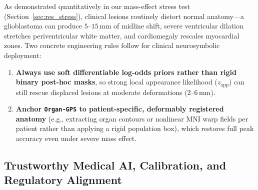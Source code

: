 \documentclass[10pt,a4paper]{article}
\renewcommand{\_}{\origunderscore\allowbreak}
\begin{document}
\begin{clinbox}
As demonstrated quantitatively in our mass-effect stress test (Section~\ref{sec:res_stress}), clinical lesions routinely distort normal anatomy---a glioblastoma can produce $5\text{--}15\,\text{mm}$ of midline shift, severe ventricular dilation stretches periventricular white matter, and cardiomegaly rescales myocardial zones. Two concrete engineering rules follow for clinical neurosymbolic deployment:
\begin{enumerate}[itemsep=1.5pt, topsep=2pt]
    \item \textbf{Always use soft differentiable log-odds priors rather than rigid binary post-hoc masks}, so strong local appearance likelihood ($z_{\text{app}}$) can still rescue displaced lesions at moderate deformations ($2\text{--}6\,\text{mm}$).
    \item \textbf{Anchor \texttt{Organ-GPS} to patient-specific, deformably registered anatomy} (e.g., extracting organ contours or nonlinear MNI warp fields per patient rather than applying a rigid population box), which restores full peak accuracy even under severe mass effect.
\end{enumerate}
\end{clinbox}

\subsection{Trustworthy Medical AI, Calibration, and Regulatory Alignment}
\label{sec:disc_regulatory}
\end{document}
